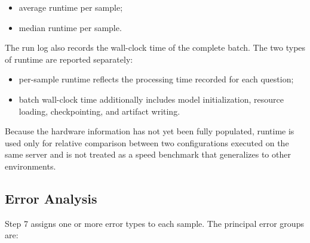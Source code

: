 \begin{itemize}
    \item average runtime per sample;
    \item median runtime per sample.
\end{itemize}

The run log also records the wall-clock time of the complete batch. The two
types of runtime are reported separately:

\begin{itemize}
    \item per-sample runtime reflects the processing time recorded for each
    question;
    \item batch wall-clock time additionally includes model initialization,
    resource loading, checkpointing, and artifact writing.
\end{itemize}

Because the hardware information has not yet been fully populated, runtime is
used only for relative comparison between two configurations executed on the
same server and is not treated as a speed benchmark that generalizes to other
environments.

\subsection{Error Analysis}

Step 7 assigns one or more error types to each sample. The principal error
groups are:

